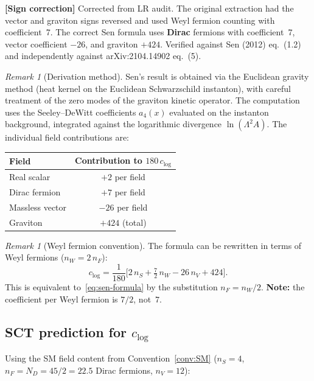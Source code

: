 \documentclass[12pt,a4paper]{article}
\theoremstyle{definition}
\theoremstyle{remark}
\newtheorem{remark}[proposition]{Remark}
\newcommand{\signcorrection}[1]{%
  \par\noindent\colorbox{red!10}{%
    \parbox{\dimexpr\linewidth-2\fboxsep}{%
      \textcolor{red!50!black}{\textbf{[Sign correction]}}
      \textcolor{red!50!black}{#1}%
    }%
  }\par%
}
\begin{document}
\signcorrection{Corrected from LR audit.  The original extraction had
the vector and graviton signs reversed and used Weyl fermion counting
with coefficient~7.  The correct Sen formula uses \textbf{Dirac}
fermions with coefficient~7, vector coefficient $-26$, and graviton
$+424$.  Verified against Sen (2012) eq.~(1.2) and independently
against arXiv:2104.14902 eq.~(5).}

\begin{remark}[Derivation method]
Sen's result is obtained via the Euclidean gravity method (heat kernel
on the Euclidean Schwarzschild instanton), with careful treatment of
the zero modes of the graviton kinetic operator.  The computation
uses the Seeley--DeWitt coefficients $a_4(x)$ evaluated on the
instanton background, integrated against the logarithmic divergence
$\ln(\Lambda^2 A)$.  The individual field contributions are:
\begin{center}
\begin{tabular}{lc}
\toprule
Field & Contribution to $180\,c_{\log}$ \\
\midrule
Real scalar & $+2$ per field \\
Dirac fermion & $+7$ per field \\
Massless vector & $-26$ per field \\
Graviton & $+424$ (total) \\
\bottomrule
\end{tabular}
\end{center}
\end{remark}

\begin{remark}[Weyl fermion convention]
The formula can be rewritten in terms of Weyl fermions
($n_W = 2\,n_F$):
\begin{equation}
  c_{\log} = \frac{1}{180}\bigl[
    2\,n_S + \tfrac{7}{2}\,n_W - 26\,n_V + 424
  \bigr].
\end{equation}
This is equivalent to~\eqref{eq:sen-formula} by the substitution
$n_F = n_W/2$.  \textbf{Note:} the coefficient per Weyl fermion
is $7/2$, not~$7$.
\end{remark}

\subsection{SCT prediction for $c_{\log}$}
\label{sec:clog-sct}

Using the SM field content from Convention~\ref{conv:SM}
($n_S = 4$, $n_F = N_D = 45/2 = 22.5$ Dirac fermions, $n_V = 12$):
\end{document}
